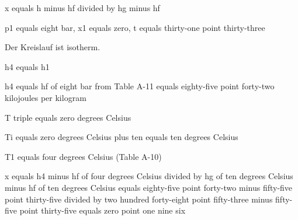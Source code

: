 x equals h minus hf divided by hg minus hf

p1 equals eight bar, x1 equals zero, t equals thirty-one point thirty-three

Der Kreislauf ist isotherm.

h4 equals h1

h4 equals hf of eight bar from Table A-11 equals eighty-five point forty-two kilojoules per kilogram

T triple equals zero degrees Celsius

Ti equals zero degrees Celsius plus ten equals ten degrees Celsius

T1 equals four degrees Celsius (Table A-10)

x equals h4 minus hf of four degrees Celsius divided by hg of ten degrees Celsius minus hf of ten degrees Celsius equals eighty-five point forty-two minus fifty-five point thirty-five divided by two hundred forty-eight point fifty-three minus fifty-five point thirty-five equals zero point one nine six
